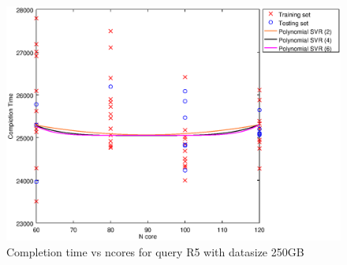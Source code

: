 
\begin {figure}[hbtp]
\centering
\includegraphics[width=\textwidth]{output/R5_250_ONLY_1_LINEAR_NCORE/plot_R5_250_bestmodels.eps}
\caption{Completion time vs ncores for query R5 with datasize 250GB}
\label{fig:only_1_linear_R5_250}
\end {figure}
